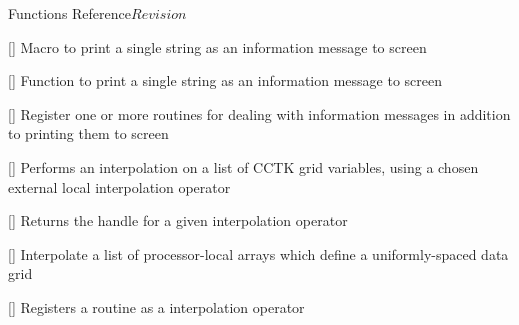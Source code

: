 \begin{cactuspart}{ Functions Reference}{}{$Revision$}
\begin{Lentry}
\item[\code{CCTK\_INFO}] [\pageref{CCTK-INFO}]
  Macro to print a single string as an information message to screen

\item[\code{CCTK\_Info}] [\pageref{CCTK-Info}]
  Function to print a single string as an information message to screen

\item[\code{CCTK\_InfoCallbackRegister}] [\pageref{CCTK-INFOCallbackRegister}]
  Register one or more routines for dealing with information messages
  in addition to printing them to screen

\item[\code{CCTK\_InterpGridArrays}] [\pageref{CCTK-InterpGridArrays}]
  Performs an interpolation on a list of CCTK grid variables,
  using a chosen external local interpolation operator

\item[\code{CCTK\_InterpHandle}] [\pageref{CCTK-InterpHandle}]
  Returns the handle for a given interpolation operator


\item[\code{CCTK\_InterpLocalUniform}] [\pageref{CCTK-InterpLocalUniform}]
  Interpolate a list of processor-local arrays
  which define a uniformly-spaced data grid



\item[\code{CCTK\_InterpRegisterOpLocalUniform}]
  [\pageref{CCTK-InterpRegisterOpLocalUniform}]
  Registers a routine as a 
  interpolation operator



\end{Lentry}
\end{cactuspart}
